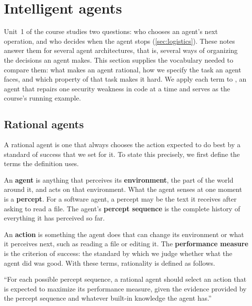 \section{Intelligent agents}
\label{sec:agents}

Unit~1 of the course studies two questions: who chooses an agent's next operation, and who decides
when the agent stops (\cref{sec:logistics}). These notes answer them for several agent
architectures, that is, several ways of organizing the decisions an agent makes. This section
supplies the vocabulary needed to compare them: what makes an agent rational, how we specify the
task an agent faces, and which property of that task makes it hard. We
apply each term to \msa{}, an agent that repairs one security weakness in code at a time and serves
as the course's running example.

\subsection{Rational agents}
\label{sec:agents-rational}

A rational agent is one that always chooses the action expected to do best by a standard of
success that we set for it. To state this precisely, we first define the terms the definition uses.

An \textbf{agent} is anything that perceives its \textbf{environment}, the part of the world around
it, and acts on that environment. What the agent senses at one moment is a \textbf{percept}. For a
software agent, a percept may be the text it receives after asking to read a file. The agent's
\textbf{percept sequence} is the complete history of everything it has perceived so far.

An \textbf{action} is something the agent does that can change its environment or what it perceives
next, such as reading a file or editing it. The \textbf{performance measure} is the criterion of
success: the standard by which we judge whether what the agent did was good. With these terms,
rationality is defined as follows.

\begin{definition}
\label{def:agents-rational}
``For each possible percept sequence, a rational agent should select an action that is expected to
maximize its performance measure, given the evidence provided by the percept sequence and whatever
built-in knowledge the agent has.'' \citep[\S2.2.2]{russell2020aima}
\end{definition}


